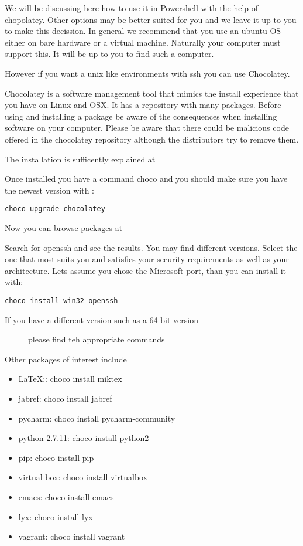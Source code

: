 We will be discussing here how to use it in Powershell with the help of
chopolatey. Other options may be better suited for you and we leave it
up to you to make this decission. In general we recommend that you use
an ubuntu OS either on bare hardware or a virtual machine. Naturally
your computer must support this. It will be up to you to find such a
computer.

However if you want a unix like environments with ssh you can use
Chocolatey.

Chocolatey is a software management tool that mimics the install
experience that you have on Linux and OSX. It has a repository with many
packages. Before using and installing a package be aware of the
consequences when installing software on your computer. Please be aware
that there could be malicious code offered in the chocolatey repository
although the distributors try to remove them.

The installation is sufficently explained at


Once installed you have a command choco and you should make sure you
have the newest version with :

\begin{verbatim}
choco upgrade chocolatey
\end{verbatim}

Now you can browse packages at


Search for openssh and see the results. You may find different versions.
Select the one that most suits you and satisfies your security
requirements as well as your architecture. Lets assume you chose the
Microsoft port, than you can install it with:

\begin{verbatim}
choco install win32-openssh
\end{verbatim}

\begin{description}
\item[If you have a different version such as a 64 bit version]
please find teh appropriate commands
\end{description}

Other packages of interest include

\begin{itemize}
\item LaTeX:: choco install miktex
\item jabref: choco install jabref
\item pycharm: choco install pycharm-community
\item python 2.7.11: choco install python2
\item pip: choco install pip
\item virtual box: choco install virtualbox
\item emacs: choco install emacs
\item lyx: choco install lyx
\item vagrant: choco install vagrant
\end{itemize}

